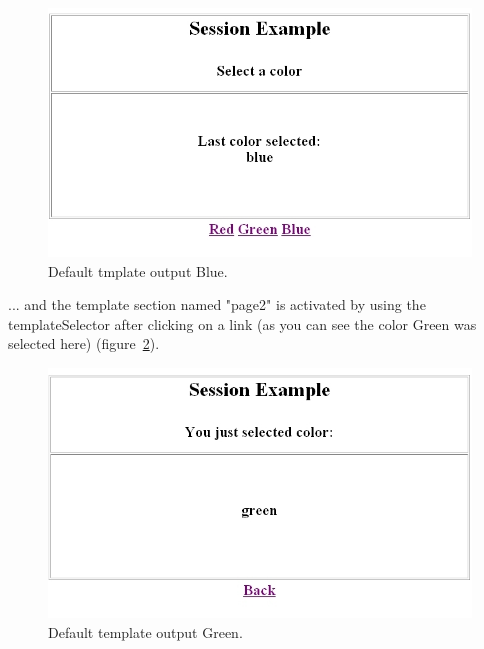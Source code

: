 \begin{figure}
\begin{center}
\includegraphics[clip,width=\sgw]{pics/modules/34}
\end{center}
\caption[Default template output Blue]{Default tmplate output Blue.}
\label{SessionExample}
\end{figure}

... and the template section named {\name "page2"} is activated by using the
templateSelector after clicking on a link (as you can see the color
Green was selected here) (figure~\ref{SessionExample2}).

\begin{figure}
\begin{center}
\includegraphics[clip,width=\sgw]{pics/modules/35}
\end{center}
\caption[Default template output Green]{Default template output Green.}
\label{SessionExample2}
\end{figure}


